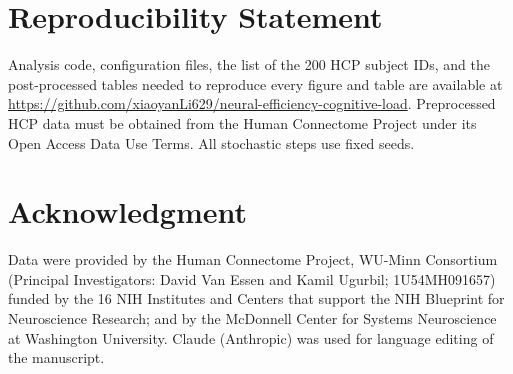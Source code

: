 \documentclass[conference]{IEEEtran}
\begin{document}
\section*{Reproducibility Statement}

Analysis code, configuration files, the list of the 200 HCP subject IDs, and the post-processed tables needed to reproduce every figure and table are available at \url{https://github.com/xiaoyanLi629/neural-efficiency-cognitive-load}. Preprocessed HCP data must be obtained from the Human Connectome Project under its Open Access Data Use Terms. All stochastic steps use fixed seeds.

\section*{Acknowledgment}

Data were provided by the Human Connectome Project, WU-Minn Consortium (Principal Investigators: David Van Essen and Kamil Ugurbil; 1U54MH091657) funded by the 16 NIH Institutes and Centers that support the NIH Blueprint for Neuroscience Research; and by the McDonnell Center for Systems Neuroscience at Washington University. Claude (Anthropic) was used for language editing of the manuscript.
\end{document}
